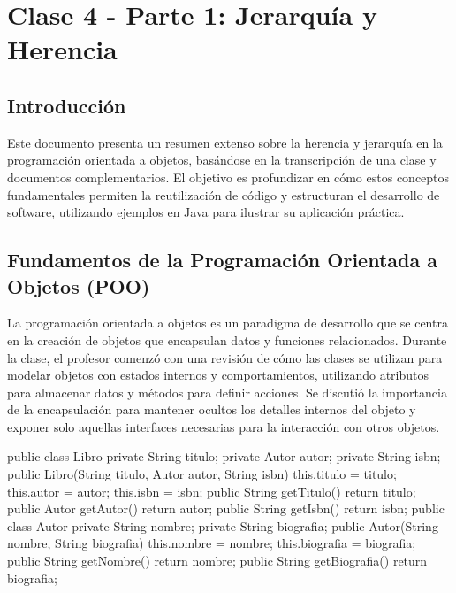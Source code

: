 \documentclass[a4paper]{report}
\begin{document}
\newpage
\maketitle

\chapter{Clase 4 - Parte 1: Jerarquía y Herencia}
\section{Introducción}
Este documento presenta un resumen extenso sobre la herencia y jerarquía en la programación orientada a objetos, basándose en la transcripción de una clase y documentos complementarios. El objetivo es profundizar en cómo estos conceptos fundamentales permiten la reutilización de código y estructuran el desarrollo de software, utilizando ejemplos en Java para ilustrar su aplicación práctica.

\section{Fundamentos de la Programación Orientada a Objetos (POO)}
La programación orientada a objetos es un paradigma de desarrollo que se centra en la creación de objetos que encapsulan datos y funciones relacionados. Durante la clase, el profesor comenzó con una revisión de cómo las clases se utilizan para modelar objetos con estados internos y comportamientos, utilizando atributos para almacenar datos y métodos para definir acciones. Se discutió la importancia de la encapsulación para mantener ocultos los detalles internos del objeto y exponer solo aquellas interfaces necesarias para la interacción con otros objetos.

\begin{roundedlst}
public class Libro {
    private String titulo;
    private Autor autor;
    private String isbn;
    public Libro(String titulo, Autor autor, String isbn){
        this.titulo = titulo;
        this.autor = autor;
        this.isbn = isbn;
    }
    public String getTitulo() {
        return titulo;
    }
    public Autor getAutor() {
        return autor;
    }
    public String getIsbn() {
        return isbn;  
    }
}
public class Autor {
    private String nombre;
    private String biografia;
    public Autor(String nombre, String biografia) {
        this.nombre = nombre;
        this.biografia = biografia;
    }
    public String getNombre() {
        return nombre;
    }
    public String getBiografia() {
        return biografia;
    }
}
\end{roundedlst}
\end{document}
